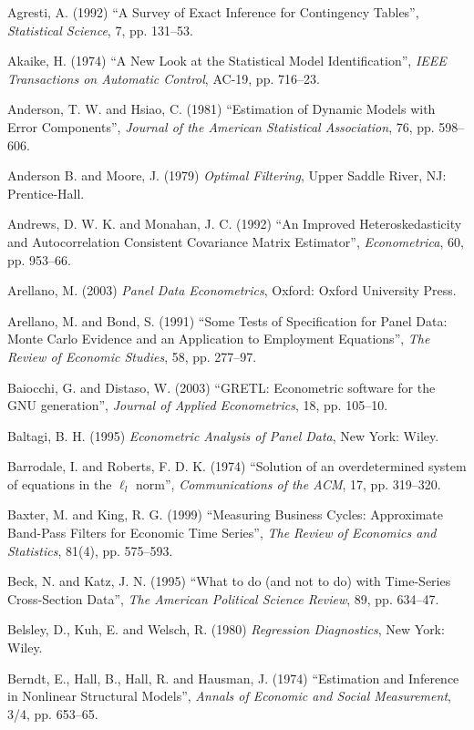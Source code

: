 \begin{thebibliography}

  Agresti, A. (1992) ``A Survey of Exact Inference for Contingency
  Tables'', \emph{Statistical Science}, 7, pp. 131--53.

  Akaike, H. (1974) ``A New Look at the Statistical Model
  Identification'', \emph{IEEE Transactions on Automatic Control},
  AC-19, pp. 716--23.

  Anderson, T. W. and Hsiao, C. (1981) ``Estimation of Dynamic Models
  with Error Components'', \emph{Journal of the American Statistical
    Association}, 76, pp. 598--606.

  Anderson B. and Moore, J. (1979) \emph{Optimal Filtering}, Upper
  Saddle River, NJ: Prentice-Hall.

  Andrews, D. W. K. and Monahan, J. C. (1992) ``An Improved
  Heteroskedasticity and Autocorrelation Consistent Covariance Matrix
  Estimator'', \emph{Econometrica}, 60, pp. 953--66.

  Arellano, M. (2003) \emph{Panel Data Econometrics}, Oxford: Oxford
  University Press.

  Arellano, M. and Bond, S. (1991) ``Some Tests of Specification for
  Panel Data: Monte Carlo Evidence and an Application to Employment
  Equations'', \emph{The Review of Economic Studies}, 58, pp.
  277--97.

  Baiocchi, G. and Distaso, W. (2003) ``GRETL: Econometric software
  for the GNU generation'', \emph{Journal of Applied Econometrics},
  18, pp. 105--10.
  
  Baltagi, B. H. (1995) \emph{Econometric Analysis of Panel Data}, New
  York: Wiley.

  Barrodale, I. and Roberts, F. D. K. (1974) ``Solution of an
  overdetermined system of equations in the $\ell_l$ norm'',
  \emph{Communications of the ACM}, 17, pp. 319--320.

  Baxter, M. and King, R. G. (1999) ``Measuring Business Cycles:
  Approximate Band-Pass Filters for Economic Time Series'', \emph{The Review
  of Economics and Statistics}, 81(4), pp. 575--593.

  Beck, N. and Katz, J. N. (1995) ``What to do (and not to do) with
  Time-Series Cross-Section Data'', \emph{The American Political
    Science Review}, 89, pp. 634--47.

  Belsley, D., Kuh, E. and Welsch, R. (1980) \emph{Regression
    Diagnostics}, New York: Wiley.

  Berndt, E., Hall, B., Hall, R. and Hausman, J. (1974) ``Estimation
  and Inference in Nonlinear Structural Models'', \emph{Annals of
    Economic and Social Measurement}, 3/4, pp. 653--65.


\end{thebibliography}
